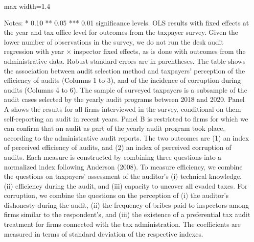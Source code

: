 \documentclass{article}
\newcommand{\OutPath}{Output/}%
\newcommand{\OutPath}{../Output/}%
\begin{document}
\begin{table}[H]\centering
\begin{adjustbox}{max width=1.4\textwidth}
\begin{threeparttable}
\caption{Algorithm Selection, Perceived Audit Efficiency and Corruption}
\label{tab:table6_indices_replicated}

\footnotesize


\begin{tablenotes}[flushleft]
\footnotesize
\item Notes: * 0.10 ** 0.05 *** 0.01 significance levels. OLS results with fixed effects at the year and tax office level for outcomes from the taxpayer survey. Given the lower number of observations in the survey, we do not run the desk audit regression with year $\times$ inspector fixed effects, as is done with outcomes from the administrative data. Robust standard errors are in parentheses. The table shows the association between audit selection method and taxpayers' perception of the efficiency of audits (Columns 1 to 3), and of the incidence of corruption during audits (Columns 4 to 6). The sample of surveyed taxpayers is a subsample of the audit cases selected by the yearly audit programs between 2018 and 2020. Panel A shows the results for all firms interviewed in the survey, conditional on them self-reporting an audit in recent years. Panel B is restricted to firms for which we can confirm that an audit as part of the yearly audit program took place, according to the administrative audit reports. The two outcomes are (1) an index of perceived efficiency of audits, and (2) an index of perceived corruption of audits. Each measure is constructed by combining three questions into a normalized index following Anderson (2008). To measure efficiency, we combine the questions on taxpayers' assessment of the auditor's (i) technical knowledge, (ii) efficiency during the audit, and (iii) capacity to uncover all evaded taxes. For corruption, we combine the questions on the perception of (i) the auditor's dishonesty during the audit, (ii) the frequency of bribes paid to inspectors among firms similar to the respondent's, and (iii) the existence of a preferential tax audit treatment for firms connected with the tax administration. The coefficients are measured in terms of standard deviation of the respective indexes.
\end{tablenotes}
\end{threeparttable}
\end{adjustbox}
\end{table}
\end{document}
